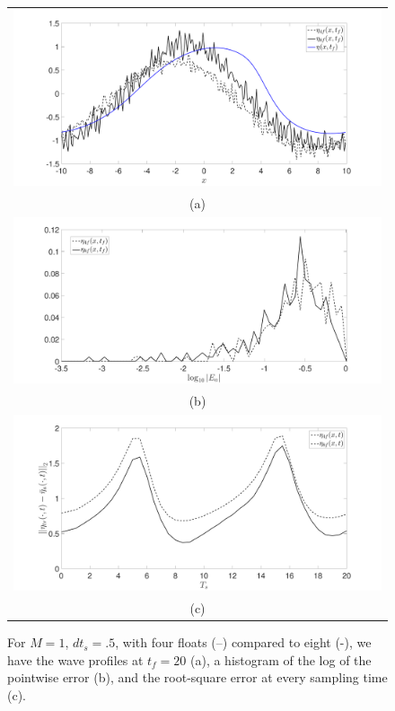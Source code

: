 \begin{figure}
	\centering
	\begin{tabular}{c}
		\includegraphics[width=.95\textwidth]{Images/wave_tf_20_sig_pt1_4_vs8floats_Mval_14} \\
		(a)\\
		\includegraphics[width=.95\textwidth]{Images/histogram_tf_20_sig_pt1_4_vs_8floats_Mval_14}\\
		(b)\\
		\includegraphics[width=.95\textwidth]{Images/rmserr_tf_20_sig_pt1_4_vs8floats_Mval_14}\\
		(c)
	\end{tabular}
	\caption{For $M=1$, $dt_{s}=.5$, with four floats (--) compared to eight (-), we have the wave profiles at $t_{f}=20$ (a), a histogram of the log of the pointwise error (b), and the root-square error at every sampling time (c).} 
	\label{fig:Mval_1}
\end{figure}

